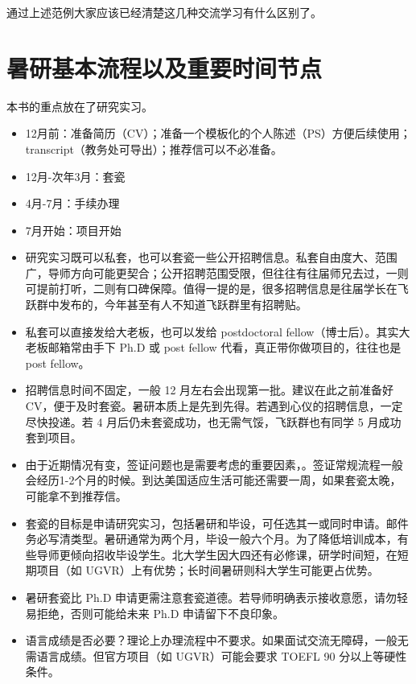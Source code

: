 通过上述范例大家应该已经清楚这几种交流学习有什么区别了。

\section{暑研基本流程以及重要时间节点}

本书的重点放在了研究实习。


\begin{itemize}
    \item 12月前：准备简历（CV）；准备一个模板化的个人陈述（PS）方便后续使用；transcript（教务处可导出）；推荐信可以不必准备。
    \item 12月-次年3月：套瓷
    \item 4月-7月：手续办理
    \item 7月开始：项目开始
\end{itemize}
\begin{remark}
    \begin{itemize}
        \item 研究实习既可以私套，也可以套瓷一些公开招聘信息。私套自由度大、范围广，导师方向可能更契合；公开招聘范围受限，但往往有往届师兄去过，一则可提前打听，二则有口碑保障。值得一提的是，很多招聘信息是往届学长在飞跃群中发布的，今年甚至有人不知道飞跃群里有招聘贴。
        
        \item 私套可以直接发给大老板，也可以发给 postdoctoral fellow（博士后）。其实大老板邮箱常由手下 Ph.D 或 post fellow 代看，真正带你做项目的，往往也是 post fellow。
        
        \item 招聘信息时间不固定，一般 12 月左右会出现第一批。建议在此之前准备好 CV，便于及时套瓷。暑研本质上是先到先得。若遇到心仪的招聘信息，一定尽快投递。若 4 月后仍未套瓷成功，也无需气馁，飞跃群也有同学 5 月成功套到项目。 
        
        \item 由于近期情况有变，签证问题也是需要考虑的重要因素，。签证常规流程一般会经历1-2个月的时候。到达美国适应生活可能还需要一周，如果套瓷太晚，可能拿不到推荐信。
        
        \item 套瓷的目标是申请研究实习，包括暑研和毕设，可任选其一或同时申请。邮件务必写清类型。暑研通常为两个月，毕设一般六个月。为了降低培训成本，有些导师更倾向招收毕设学生。北大学生因大四还有必修课，研学时间短，在短期项目（如 UGVR）上有优势；长时间暑研则科大学生可能更占优势。
        
        \item 暑研套瓷比 Ph.D 申请更需注意套瓷道德。若导师明确表示接收意愿，请勿轻易拒绝，否则可能给未来 Ph.D 申请留下不良印象。
        
        \item 语言成绩是否必要？理论上办理流程中不要求。如果面试交流无障碍，一般无需语言成绩。但官方项目（如 UGVR）可能会要求 TOEFL 90 分以上等硬性条件。
    \end{itemize}
\end{remark}

